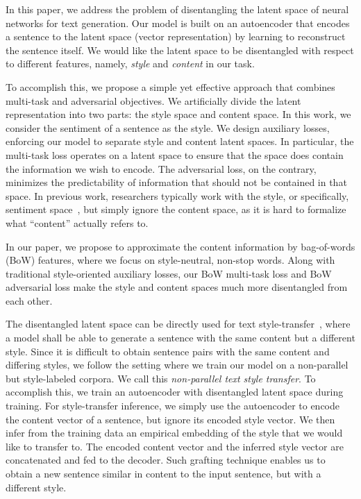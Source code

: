 \documentclass[letterpaper]{article} %
\begin{document}
In this paper, we address the problem of disentangling the latent space of neural networks for text generation.
Our model is built on an autoencoder that encodes a sentence to the latent space (vector representation) by learning to reconstruct the sentence itself.
We would like the latent space to be disentangled with respect to different features, namely, \textit{style} and \textit{content} in our task.

To accomplish this, we propose a simple yet effective approach that combines multi-task and adversarial objectives. We artificially divide the latent representation into two parts: the style space and content space. In this work, we consider the sentiment of a sentence as the style.
We design auxiliary losses, enforcing our model to separate style and content latent spaces.
In particular, the multi-task loss operates on a latent space to ensure that the space does contain the information we wish to encode.
The adversarial loss, on the contrary, minimizes the predictability of information that should not be contained in that space.
In previous work, researchers typically work with the style, or specifically, sentiment space~\cite{hu2017toward,shen2017style,fu2017style,zhao2018adversarially}, but simply ignore the content space, as it is hard to formalize what ``content'' actually refers to.

In our paper, we propose to approximate the content information by bag-of-words (BoW) features, where we focus on style-neutral, non-stop words.
Along with traditional style-oriented auxiliary losses, our BoW multi-task loss and BoW adversarial loss make the style and content spaces much more disentangled from each other.

The disentangled latent space can be directly used for text style-transfer~\cite{hu2017toward,shen2017style,fu2017style}, where a model shall be able to generate a sentence with the same content but a different style.
Since it is difficult to obtain sentence pairs with the same content and differing styles, we follow the setting where we train our model on a non-parallel but style-labeled corpora. We call this \textit{non-parallel text style transfer}.
To accomplish this, we train an autoencoder with disentangled latent space during training.
For style-transfer inference, we simply use the autoencoder to encode the content vector of a sentence, but ignore its encoded style vector.
We then infer from the training data an empirical embedding of the style that we would like to transfer to.
The encoded content vector and the inferred style vector are concatenated and fed to the decoder.
Such grafting technique enables us to obtain a new sentence similar in content to the input sentence, but with a different style.
\end{document}
